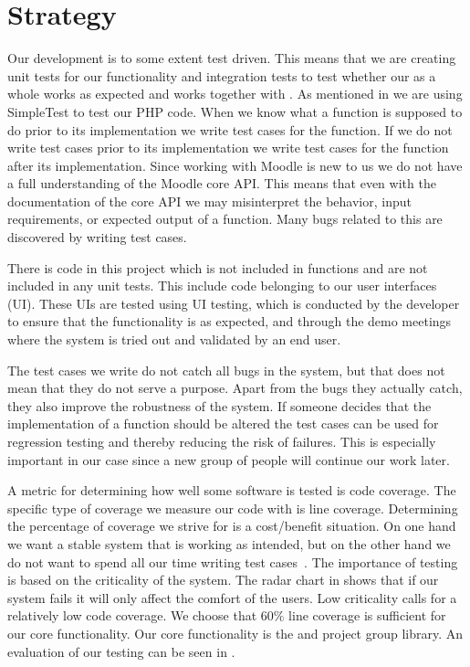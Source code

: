 \section{Strategy}
\label{sec:strategy}
\newcommand{\idealCC}{$60\%$}
Our development is to some extent test driven.
This means that we are creating unit tests for our functionality and integration tests to test whether our \subsystem{} as a whole works as expected and works together with \moodle{}.
As mentioned in  we are using SimpleTest to test our PHP code.
When we know what a function is supposed to do prior to its implementation we write test cases for the function.
If we do not write test cases prior to its implementation we write test cases for the function after its implementation. 
Since working with Moodle is new to us we do not have a full understanding of the Moodle core API.
This means that even with the documentation of the \moodle{} core API we may misinterpret the behavior, input requirements, or expected output of a function.
Many bugs related to this are discovered by writing test cases.

There is code in this project which is not included in functions and are not included in any unit tests.
This include code belonging to our user interfaces (UI).
These UIs are tested using UI testing, which is conducted by the developer to ensure that the functionality is as expected, and through the demo meetings where the system is tried out and validated by an end user. 

The test cases we write do not catch all bugs in the system, but that does not mean that they do not serve a purpose.
Apart from the bugs they actually catch, they also improve the robustness of the system.
If someone decides that the implementation of a function should be altered the test cases can be used for regression testing and thereby reducing the risk of failures. 
This is especially important in our case since a new group of people will continue our work later.

A metric for determining how well some software is tested is code coverage. 
The specific type of coverage we measure our code with is line coverage. 
Determining the percentage of coverage we strive for is a cost/benefit situation.
On one hand we want a stable system that is working as intended, but on the other hand we do not want to spend all our time writing test cases~\cite[pp.~39-40]{Patton05}.
The importance of testing is based on the criticality of the system.
The radar chart in  shows that if our system fails it will only affect the comfort of the users.
Low criticality calls for a relatively low code coverage.
We choose that \idealCC{} line coverage is sufficient for our core functionality.
Our core functionality is the \admlib{} and project group library.
An evaluation of our testing can be seen in .

